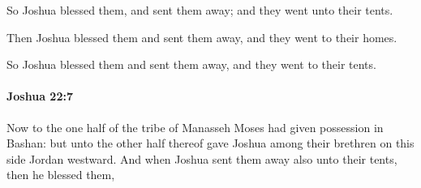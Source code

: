 			\begin{versebox}
					\item[BHS] 
					\item[ASV] So Joshua blessed them, and sent them away; and they went unto their tents.
					\item[NIV] Then Joshua blessed them and sent them away, and they went to their homes.
					\item[NRSV] So Joshua blessed them and sent them away, and they went to their tents.
			\end{versebox}

		\paragraph{Joshua 22:7} %
			\label{JOSHUA-22-7}

			Now to the one half of the tribe of Manasseh Moses had given possession in Bashan: but unto the other half thereof gave Joshua among their brethren on this side Jordan westward. And when Joshua sent them away also unto their tents, then he blessed them,

